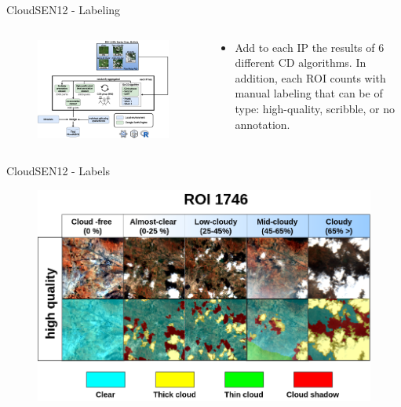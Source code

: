 \begin{frame}{CloudSEN12 - Labeling}
	\begin{columns}
		\begin{column}{0.7\textwidth}
			\begin{figure}
				\includegraphics[width=1\textwidth]{images/methodology03.png}
				\label{fig:introfig02}
			\end{figure}
		\end{column}
		\begin{column}{0.3\textwidth}
			\begin{itemize}
				\item Add to each IP the results of 6 different CD algorithms. In addition, each ROI counts with manual labeling that can be of type: high-quality, scribble, or no annotation.
			\end{itemize}
		\end{column}
	\end{columns}
\end{frame}


\begin{frame}{CloudSEN12 - Labels}
\begin{figure}
	\centering
	\includegraphics[width=0.7\linewidth]{images/labels01}
	\caption{}
	\label{fig:labels01}
\end{figure}
\end{frame}


